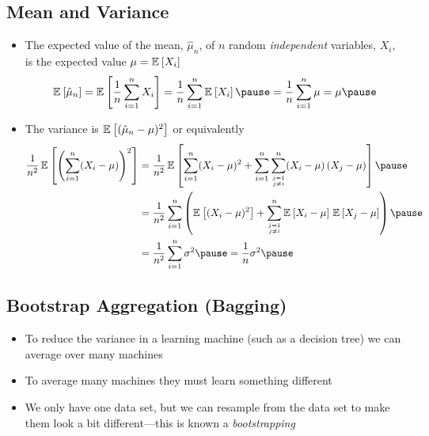 
\begin{slide}
\section[-2]{Mean and Variance}

\begin{PauseHighLight}\small
  \begin{itemize}
  \item The expected value of the mean, $\hat{\mu}_n$, of $n$ random
    \emph{independent} variables, $X_i$, is the expected value $\mu=\mathbb{E}_{}\left[ X_i \right]$
    \begin{align*}
      \av{\hat{\mu}_n}
      =\av{\frac{1}{n} \sum_{i=1}^n X_i } = \frac{1}{n} \sum_{i=1}^n
      \av{X_i} \pause = \frac{1}{n} \sum_{i=1}^n \mu = \mu\pause
    \end{align*}
  \item The variance is $\mathbb{E}_{}\left[  (\hat{\mu}_n-\mu)^2  \right]$ or equivalently 
    \begin{align*}
      \frac{1}{n^2} \, \av{ \left(\sum_{i=1}^n (X_i -\mu)\right)^2}
      &=\frac{1}{n^2} \, \av{ \sum_{i=1}^n (X_i -\mu)^2
        + \sum_{i=1}^n\sum_{j=1\atop j\neq i}^n (X_i-\mu)\,(X_j-\mu)}\pause\\
      &= \frac{1}{n^2}\sum_{i=1}^n \left( \av{(X_i -\mu)^2}
        + \sum_{j=1\atop j\neq i}^n
      \av{X_i-\mu}\,\av{X_j-\mu} \right)\pause\\
      &=\frac{1}{n^2} \sum_{i=1}^n \sigma^2\pause = \frac{1}{n} \sigma^2
        \pause
    \end{align*}
  \end{itemize}
\end{PauseHighLight}


\end{slide}


\begin{slide}
\section[-2]{Bootstrap Aggregation (Bagging)}

\pb
\begin{itemize}
\item To reduce the variance in a learning machine (such as a decision
  tree) we can average over many machines\pauseh
\item To average many machines they must learn something different\pauseh
\item We only have one data set, but we can resample from the data set
  to make them look a bit different\pauseh---this is known a
  \emph{bootstrapping}\pauseh
\end{itemize}
\begin{center}
  \pause
\end{center}

\end{slide}

